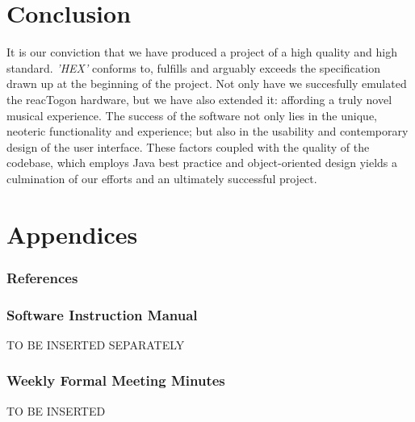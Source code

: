 \documentclass[10pt,a4paper]{article}
\begin{document}
\part{Conclusion}
It is our conviction that we have produced a project of a high quality and high standard. \textit{'HEX'} conforms to, fulfills and arguably exceeds the specification drawn up at the beginning of the project. Not only have we succesfully emulated the reacTogon hardware, but we have also extended it: affording a truly novel musical experience. The success of the software not only lies in the unique, neoteric functionality and experience; but also in the usability and contemporary design of the user interface. These factors coupled with the quality of the codebase, which employs Java best practice and object-oriented design yields a culmination of our efforts and an ultimately successful project.

\pagebreak
\part{Appendices}
\section{References}



\pagebreak
\section{Software Instruction Manual}
TO BE INSERTED SEPARATELY

\pagebreak
\section{Weekly Formal Meeting Minutes}
TO BE INSERTED
\end{document}
